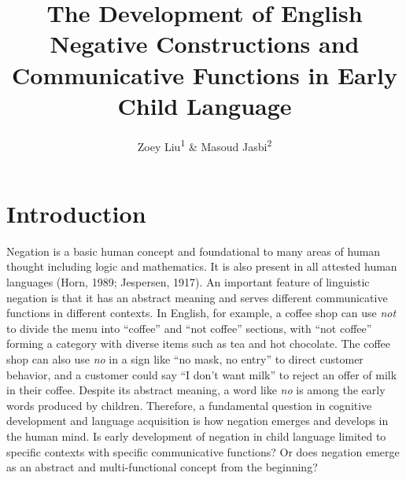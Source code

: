 \documentclass[
  man,floatsintext]{apa6}
\title{The Development of English Negative Constructions and Communicative Functions in Early Child Language}
\author{Zoey Liu\textsuperscript{1} \& Masoud Jasbi\textsuperscript{2}}
\date{}
\affiliation{\vspace{0.5cm}\textsuperscript{1} Boston College\\\textsuperscript{2} Uinversity of California, Davis}
\begin{document}
\maketitle

\hypertarget{introduction}{%
\section{Introduction}\label{introduction}}

Negation is a basic human concept and foundational to many areas of human thought including logic and mathematics. It is also present in all attested human languages (Horn, 1989; Jespersen, 1917). An important feature of linguistic negation is that it has an abstract meaning and serves different communicative functions in different contexts. In English, for example, a coffee shop can use \emph{not} to divide the menu into ``coffee'' and ``not coffee'' sections, with ``not coffee'' forming a category with diverse items such as tea and hot chocolate. The coffee shop can also use \emph{no} in a sign like ``no mask, no entry'' to direct customer behavior, and a customer could say ``I don't want milk'' to reject an offer of milk in their coffee. Despite its abstract meaning, a word like \emph{no} is among the early words produced by children. Therefore, a fundamental question in cognitive development and language acquisition is how negation emerges and develops in the human mind. Is early development of negation in child language limited to specific contexts with specific communicative functions? Or does negation emerge as an abstract and multi-functional concept from the beginning?
\end{document}
